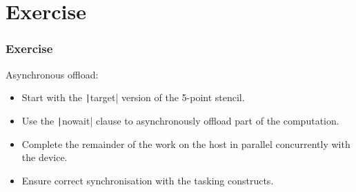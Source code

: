 \documentclass{beamer}
\begin{document}
\section{Exercise}
\begin{frame}
\frametitle{Exercise}

Asynchronous offload:
\begin{itemize}
  \item Start with the \texttt|target| version of the 5-point stencil.
  \item Use the \texttt|nowait| clause to asynchronously offload part of the computation.
  \item Complete the remainder of the work on the host in parallel concurrently with the device.
  \item Ensure correct synchronisation with the tasking constructs.
\end{itemize}

\end{frame}

\end{document}
